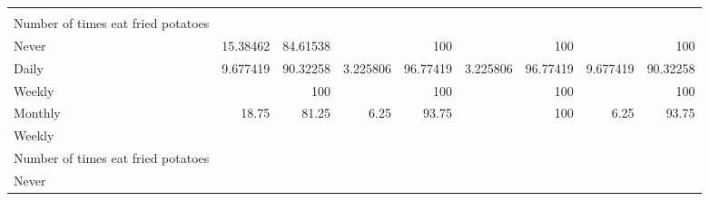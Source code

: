 \documentclass{article}
\begin{document}
\begin{tabular}{lllllllll}
  \multicolumn{1}{r}{} &
  \multicolumn{1}{r}{} &
  \multicolumn{1}{r}{} &
  \multicolumn{1}{r}{} \\
\multicolumn{1}{l}{\hspace{4em}Number of times eat fried potatoes} &
  \multicolumn{1}{|r}{} &
  \multicolumn{1}{r}{} &
  \multicolumn{1}{r}{} &
  \multicolumn{1}{r}{} &
  \multicolumn{1}{r}{} &
  \multicolumn{1}{r}{} &
  \multicolumn{1}{r}{} &
  \multicolumn{1}{r}{} \\
\multicolumn{1}{l}{\hspace{5em}Never} &
  \multicolumn{1}{|r}{15.38462} &
  \multicolumn{1}{r}{84.61538} &
  \multicolumn{1}{r}{} &
  \multicolumn{1}{r}{100} &
  \multicolumn{1}{r}{} &
  \multicolumn{1}{r}{100} &
  \multicolumn{1}{r}{} &
  \multicolumn{1}{r}{100} \\
\multicolumn{1}{l}{\hspace{5em}Daily} &
  \multicolumn{1}{|r}{9.677419} &
  \multicolumn{1}{r}{90.32258} &
  \multicolumn{1}{r}{3.225806} &
  \multicolumn{1}{r}{96.77419} &
  \multicolumn{1}{r}{3.225806} &
  \multicolumn{1}{r}{96.77419} &
  \multicolumn{1}{r}{9.677419} &
  \multicolumn{1}{r}{90.32258} \\
\multicolumn{1}{l}{\hspace{5em}Weekly} &
  \multicolumn{1}{|r}{} &
  \multicolumn{1}{r}{100} &
  \multicolumn{1}{r}{} &
  \multicolumn{1}{r}{100} &
  \multicolumn{1}{r}{} &
  \multicolumn{1}{r}{100} &
  \multicolumn{1}{r}{} &
  \multicolumn{1}{r}{100} \\
\multicolumn{1}{l}{\hspace{5em}Monthly} &
  \multicolumn{1}{|r}{18.75} &
  \multicolumn{1}{r}{81.25} &
  \multicolumn{1}{r}{6.25} &
  \multicolumn{1}{r}{93.75} &
  \multicolumn{1}{r}{} &
  \multicolumn{1}{r}{100} &
  \multicolumn{1}{r}{6.25} &
  \multicolumn{1}{r}{93.75} \\
\multicolumn{1}{l}{\hspace{3em}Weekly} &
  \multicolumn{1}{|r}{} &
  \multicolumn{1}{r}{} &
  \multicolumn{1}{r}{} &
  \multicolumn{1}{r}{} &
  \multicolumn{1}{r}{} &
  \multicolumn{1}{r}{} &
  \multicolumn{1}{r}{} &
  \multicolumn{1}{r}{} \\
\multicolumn{1}{l}{\hspace{4em}Number of times eat fried potatoes} &
  \multicolumn{1}{|r}{} &
  \multicolumn{1}{r}{} &
  \multicolumn{1}{r}{} &
  \multicolumn{1}{r}{} &
  \multicolumn{1}{r}{} &
  \multicolumn{1}{r}{} &
  \multicolumn{1}{r}{} &
  \multicolumn{1}{r}{} \\
\multicolumn{1}{l}{\hspace{5em}Never} &

\end{tabular}
\end{document}
